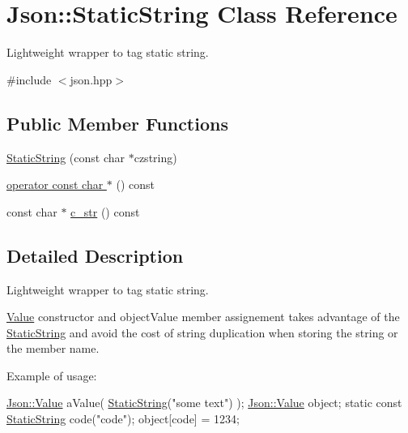 \hypertarget{class_json_1_1_static_string}{\section{Json\-:\-:Static\-String Class Reference}
\label{class_json_1_1_static_string}
}


Lightweight wrapper to tag static string.  




{\ttfamily \#include $<$json.\-hpp$>$}

\subsection*{Public Member Functions}
\begin{DoxyCompactItemize}
\item 
\hyperlink{class_json_1_1_static_string_afb6baf1ec078ce76f0b0f9b39d19437f}{Static\-String} (const char $\ast$czstring)
\item 
\hyperlink{class_json_1_1_static_string_ac2b334d46bbea4c0227e508fc66433e9}{operator const char $\ast$} () const 
\item 
const char $\ast$ \hyperlink{class_json_1_1_static_string_ab86fc6a3183adf12fdba4b370acf1754}{c\-\_\-str} () const 
\end{DoxyCompactItemize}


\subsection{Detailed Description}
Lightweight wrapper to tag static string. 

\hyperlink{class_json_1_1_value}{Value} constructor and object\-Value member assignement takes advantage of the \hyperlink{class_json_1_1_static_string}{Static\-String} and avoid the cost of string duplication when storing the string or the member name.

Example of usage\-: 
\begin{DoxyCode}
\hyperlink{class_json_1_1_value}{Json::Value} aValue( \hyperlink{class_json_1_1_static_string_afb6baf1ec078ce76f0b0f9b39d19437f}{StaticString}(\textcolor{stringliteral}{"some text"}) );
\hyperlink{class_json_1_1_value}{Json::Value} object;
\textcolor{keyword}{static} \textcolor{keyword}{const} \hyperlink{class_json_1_1_static_string_afb6baf1ec078ce76f0b0f9b39d19437f}{StaticString} code(\textcolor{stringliteral}{"code"});
\textcolor{keywordtype}{object}[code] = 1234;
\end{DoxyCode}
 

